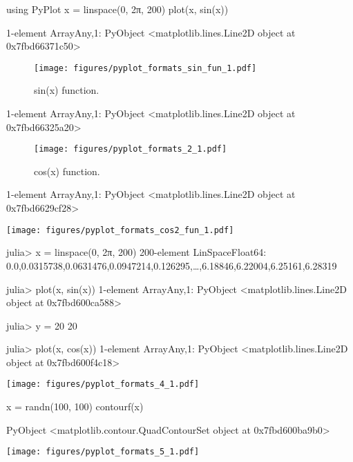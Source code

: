 \begin{juliacode}
using PyPlot
x = linspace(0, 2π, 200)
plot(x, sin(x))
\end{juliacode}
\begin{juliaout}
1-element Array{Any,1}:
 PyObject <matplotlib.lines.Line2D object at 0x7fbd66371c50>
\end{juliaout}
\begin{figure}[ht]
\center
\texttt{[image: figures/pyplot\_formats\_sin\_fun\_1.pdf]}
\caption{sin(x) function.}
\label{fig:sin_fun}
\end{figure}

\begin{juliaout}
1-element Array{Any,1}:
 PyObject <matplotlib.lines.Line2D object at 0x7fbd66325a20>
\end{juliaout}
\begin{figure}[htpb]
\center
\texttt{[image: figures/pyplot\_formats\_2\_1.pdf]}
\caption{cos(x) function.}
\end{figure}

\begin{juliaout}
1-element Array{Any,1}:
 PyObject <matplotlib.lines.Line2D object at 0x7fbd6629cf28>
\end{juliaout}
\texttt{[image: figures/pyplot\_formats\_cos2\_fun\_1.pdf]}

\begin{juliaterm}
julia> x = linspace(0, 2π, 200)
200-element LinSpace{Float64}:
 0.0,0.0315738,0.0631476,0.0947214,0.126295,…,6.18846,6.22004,6.25161,6.28319

julia> plot(x, sin(x))
1-element Array{Any,1}:
 PyObject <matplotlib.lines.Line2D object at 0x7fbd600ca588>

julia> y = 20
20

julia> plot(x, cos(x))
1-element Array{Any,1}:
 PyObject <matplotlib.lines.Line2D object at 0x7fbd600f4c18>

\end{juliaterm}
\texttt{[image: figures/pyplot\_formats\_4\_1.pdf]}

\begin{juliacode}
x = randn(100, 100)
contourf(x)
\end{juliacode}
\begin{juliaout}
PyObject <matplotlib.contour.QuadContourSet object at 0x7fbd600ba9b0>
\end{juliaout}
\texttt{[image: figures/pyplot\_formats\_5\_1.pdf]}
